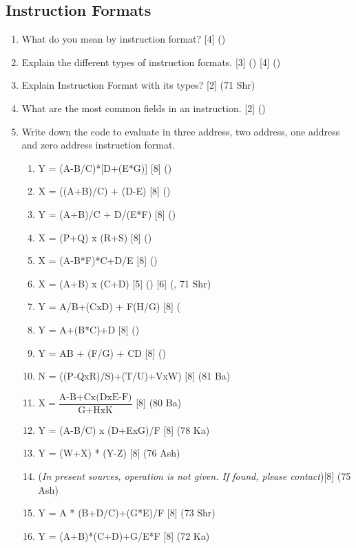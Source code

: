 \documentclass[12pt]{article}
\begin{document}
	\subsection{Instruction Formats}
	\begin{enumerate}
		\item What do you mean by instruction format? \hfill [4] ()
		
		\item Explain the different types of instruction formats. \hfill [3] () [4] ()
		
		\item Explain Instruction Format with its types? \hfill [2] (71 Shr)
		
		\item What are the most common fields in an instruction. \hfill [2] ()
		
		\item Write down the code to evaluate in three address, two address, one address and zero address instruction format.
		\begin{enumerate}[noitemsep, topsep = 0pt, label = \alph*.]
			\item Y = (A-B/C)*[D+(E*G)] \hfill [8] ()
			\item X = ((A+B)/C) + (D-E) \hfill [8] ()
			\item Y = (A+B)/C + D/(E*F) \hfill [8] ()
			\item X = (P+Q) x (R+S) \hfill [8] ()
			\item X = (A-B*F)*C+D/E \hfill [8] ()
			\item X = (A+B) x (C+D) \hfill [5] () [6] (, 71 Shr)
			\item Y = A/B+(CxD) + F(H/G) \hfill [8] (
			\item Y = A+(B*C)+D \hfill [8] ()
			\item Y = AB + (F/G) + CD \hfill [8] ()
			\item N = ((P-QxR)/S)+(T/U)+VxW) \hfill [8] (81 Ba)
			\item $\text{X} = \dfrac{\text{A-B+Cx(DxE-F})}{\text{G+HxK}}$ \hfill [8] (80 Ba)
			\item Y = (A-B/C) x (D+ExG)/F \hfill [8] (78 Ka)
			\item Y = (W+X) * (Y-Z) \hfill [8] (76 Ash)
			\item (\textit{In present sources, operation is not given. If found, please contact})\hfill [8] (75 Ash)
			\item Y = A * (B+D/C)+(G*E)/F \hfill [8] (73 Shr)
			\item Y = (A+B)*(C+D)+G/E*F \hfill [8] (72 Ka)
			
		\end{enumerate}
	\end{enumerate}
\end{document}
